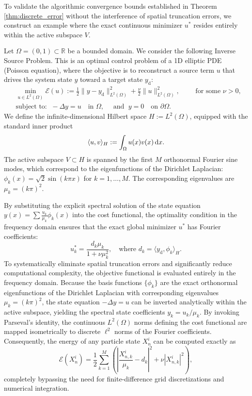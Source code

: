 \documentclass[12pt]{amsart}
\newcommand{\D}[1]{\mbox{\rm #1}}
\newcommand{\dd}{\D{d}}
\numberwithin{equation}{section}
\begin{document}
To validate the algorithmic convergence bounds established in Theorem \ref{thm:discrete_error} without the interference of spatial truncation errors, we construct an example where the exact continuous minimizer $u^*$ resides entirely within the active subspace $V$. 

Let $\Omega = (0,1) \subset \mathbb{R}$ be a bounded domain. 
We consider the following Inverse Source Problem. 
This is an optimal control problem of a 1D elliptic PDE (Poisson equation), where the objective is to reconstruct a source term $u$ that drives the system state $y$ toward a target state $y_{\text{d}}$:
\begin{equation}\label{ex:control pde}
\begin{aligned}
    & \min\limits_{u \in L^2(\Omega)} \mathscr{E}(u) := \frac{1}{2}\|y - y_{\text{d}}\|_{L^2(\Omega)}^2 + \frac{\nu}{2}\|u\|_{L^2(\Omega)}^2, \qquad  \text{ for some } \nu > 0,\\
    & \text{subject to: }\; -\Delta y = u \quad \text{in } \Omega,\quad \text{ and } \; y = 0 \quad \text{on } \partial\Omega.
\end{aligned}
\end{equation}
We define the infinite-dimensional Hilbert space $H := L^2(\Omega)$, equipped with the standard inner product
\[
\langle u,v \rangle_H := \int_\Omega u(x)v(x)\,\dd x.
\]
The active subspace $V \subset H$ is spanned by the first $M$ orthonormal Fourier sine modes, which correspond to the eigenfunctions of the Dirichlet Laplacian: $\phi_k(x) = \sqrt{2} \sin(k \pi x)$ for $k = 1, \dots, M$. The corresponding eigenvalues are $\mu_k = (k\pi)^2$. 

By substituting the explicit spectral solution of the state equation $y(x) = \sum \frac{u_k}{\mu_k} \phi_k(x)$ into the cost functional, the optimality condition in the frequency domain ensures that the exact global minimizer $u^*$ has Fourier coefficients:
\begin{equation}
    u_k^* = \frac{d_k \mu_k}{1 + \nu \mu_k^2}, \quad \text{where } d_k = \langle y_{\text{d}}, \phi_k \rangle_H.
\end{equation}
To systematically eliminate spatial truncation errors and significantly reduce computational complexity, the objective functional is evaluated entirely in the frequency domain. Because the basis functions $\{\phi_k\}$ are the exact orthonormal eigenfunctions of the Dirichlet Laplacian with corresponding eigenvalues $\mu_k = (k\pi)^2$, the state equation $-\Delta y = u$ can be inverted analytically within the active subspace, yielding the spectral state coefficients $y_k = u_k/\mu_k$. By invoking Parseval's identity, the continuous $L^2(\Omega)$ norms defining the cost functional are mapped isometrically to discrete $\ell^2$ norms of the Fourier coefficients. Consequently, the energy of any particle state $X_n^i$ can be computed exactly as
$$ \mathscr{E}(X_n^i) = \frac{1}{2} \sum_{k=1}^M \left( \left| \frac{X_{n,k}^i}{\mu_k} - d_k \right|^2 + \nu |X_{n,k}^i|^2 \right), $$
completely bypassing the need for finite-difference grid discretizations and numerical integration.
\end{document}
